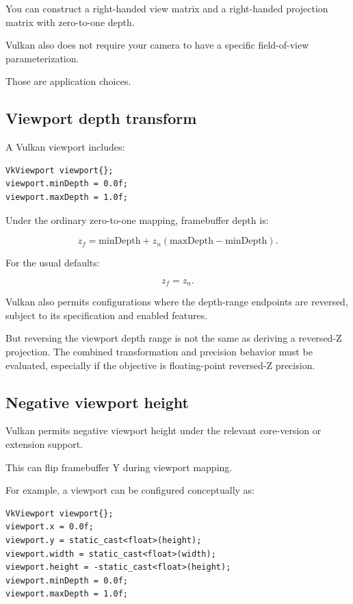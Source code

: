 You can construct a right-handed view matrix and a right-handed projection matrix with zero-to-one depth.

Vulkan also does not require your camera to have a specific field-of-view parameterization.

Those are application choices.

\subsection{Viewport depth transform}\label{02-foundations-ii-ch033-viewport-depth-transform}

A Vulkan viewport includes:

\begin{verbatim}
VkViewport viewport{};
viewport.minDepth = 0.0f;
viewport.maxDepth = 1.0f;
\end{verbatim}

Under the ordinary zero-to-one mapping, framebuffer depth is:

\[
 \boxed{ z_f= \text{minDepth} + z_n(\text{maxDepth}-\text{minDepth}) }.
\]

For the usual defaults:

\[
 z_f=z_n.
\]

Vulkan also permits configurations where the depth-range endpoints are reversed, subject to its specification and enabled features.

But reversing the viewport depth range is not the same as deriving a reversed-Z projection. The combined transformation and precision behavior must be evaluated, especially if the objective is floating-point reversed-Z precision.

\subsection{Negative viewport height}\label{02-foundations-ii-ch033-negative-viewport-height}

Vulkan permits negative viewport height under the relevant core-version or extension support.

This can flip framebuffer Y during viewport mapping.

For example, a viewport can be configured conceptually as:

\begin{verbatim}
VkViewport viewport{};
viewport.x = 0.0f;
viewport.y = static_cast<float>(height);
viewport.width = static_cast<float>(width);
viewport.height = -static_cast<float>(height);
viewport.minDepth = 0.0f;
viewport.maxDepth = 1.0f;
\end{verbatim}

